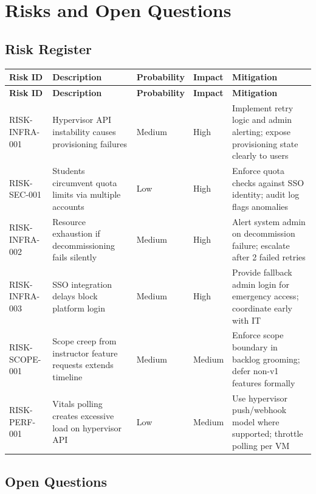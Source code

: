 \documentclass[12pt,letterpaper]{article}
\begin{document}
\section{Risks and Open Questions}

\subsection{Risk Register}

\begin{longtable}{L{2.4cm} L{4cm} L{2cm} L{1.8cm} L{4cm}}
  \toprule
  \textbf{Risk ID} & \textbf{Description} & \textbf{Probability} & \textbf{Impact} & \textbf{Mitigation} \\
  \midrule
  \endfirsthead
  \toprule
  \textbf{Risk ID} & \textbf{Description} & \textbf{Probability} & \textbf{Impact} & \textbf{Mitigation} \\
  \midrule
  \endhead
  \bottomrule
  \endfoot

  RISK-INFRA-001 & Hypervisor API instability causes provisioning failures & Medium & High & Implement retry logic and admin alerting; expose provisioning state clearly to users \\
  \addlinespace
  RISK-SEC-001 & Students circumvent quota limits via multiple accounts & Low & High & Enforce quota checks against SSO identity; audit log flags anomalies \\
  \addlinespace
  RISK-INFRA-002 & Resource exhaustion if decommissioning fails silently & Medium & High & Alert system admin on decommission failure; escalate after 2 failed retries \\
  \addlinespace
  RISK-INFRA-003 & SSO integration delays block platform login & Medium & High & Provide fallback admin login for emergency access; coordinate early with IT \\
  \addlinespace
  RISK-SCOPE-001 & Scope creep from instructor feature requests extends timeline & Medium & Medium & Enforce scope boundary in backlog grooming; defer non-v1 features formally \\
  \addlinespace
  RISK-PERF-001 & Vitals polling creates excessive load on hypervisor API & Low & Medium & Use hypervisor push/webhook model where supported; throttle polling per VM \\
\end{longtable}

\subsection{Open Questions}
\end{document}
